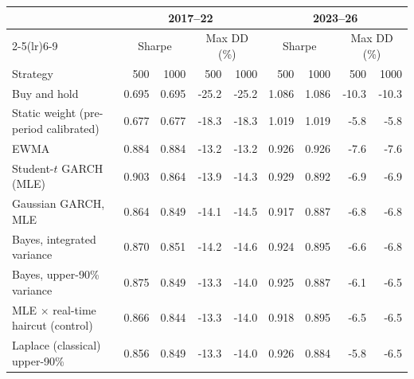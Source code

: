 \begin{tabular}{lrrrrrrrr}\toprule
 & \multicolumn{4}{c}{2017--22} & \multicolumn{4}{c}{2023--26}\\\cmidrule(lr){2-5}\cmidrule(lr){6-9}
 & \multicolumn{2}{c}{Sharpe} & \multicolumn{2}{c}{Max DD (\%)} & \multicolumn{2}{c}{Sharpe} & \multicolumn{2}{c}{Max DD (\%)}\\
Strategy & 500 & 1000 & 500 & 1000 & 500 & 1000 & 500 & 1000\\\midrule
Buy and hold & 0.695 & 0.695 & -25.2 & -25.2 & 1.086 & 1.086 & -10.3 & -10.3 \\
Static weight (pre-period calibrated) & 0.677 & 0.677 & -18.3 & -18.3 & 1.019 & 1.019 & -5.8 & -5.8 \\
EWMA & 0.884 & 0.884 & -13.2 & -13.2 & 0.926 & 0.926 & -7.6 & -7.6 \\
Student-$t$ GARCH (MLE) & 0.903 & 0.864 & -13.9 & -14.3 & 0.929 & 0.892 & -6.9 & -6.9 \\
Gaussian GARCH, MLE & 0.864 & 0.849 & -14.1 & -14.5 & 0.917 & 0.887 & -6.8 & -6.8 \\
Bayes, integrated variance & 0.870 & 0.851 & -14.2 & -14.6 & 0.924 & 0.895 & -6.6 & -6.8 \\
Bayes, upper-90\% variance & 0.875 & 0.849 & -13.3 & -14.0 & 0.925 & 0.887 & -6.1 & -6.5 \\
MLE $\times$ real-time haircut (control) & 0.866 & 0.844 & -13.3 & -14.0 & 0.918 & 0.895 & -6.5 & -6.5 \\
Laplace (classical) upper-90\% & 0.856 & 0.849 & -13.3 & -14.0 & 0.926 & 0.884 & -5.8 & -6.5 \\
\bottomrule\end{tabular}
